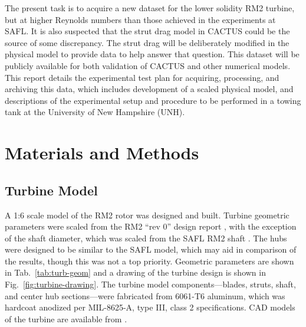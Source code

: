 \documentclass[10pt,letterpaper]{article}
\begin{document}
The present task is to acquire a new dataset for the lower solidity RM2 turbine,
but at higher Reynolds numbers than those achieved in the experiments at SAFL.
It is also suspected that the strut drag model in CACTUS could be the source of
some discrepancy. The strut drag will be deliberately modified in the physical
model to provide data to help answer that question. This dataset will be
publicly available for both validation of CACTUS and other numerical models.
This report details the experimental test plan for acquiring, processing, and
archiving this data, which includes development of a scaled physical model, and
descriptions of the experimental setup and procedure to be performed in a towing
tank at the University of New Hampshire (UNH).

\section*{Materials and Methods}

\subsection*{Turbine Model}

A 1:6 scale model of the RM2 rotor was designed and built. Turbine geometric
parameters were scaled from the RM2 ``rev 0'' design report \cite{Barone2011},
with the exception of the shaft diameter, which was scaled from the SAFL RM2
shaft \cite{Hill2014}. The hubs were designed to be similar to the SAFL model,
which may aid in comparison of the results, though this was not a top priority.
Geometric parameters are shown in Tab.~\ref{tab:turb-geom} and a drawing of the
turbine design is shown in Fig.~\ref{fig:turbine-drawing}. The turbine model
components---blades, struts, shaft, and center hub sections---were fabricated
from 6061-T6 aluminum, which was hardcoat anodized per MIL-8625-A, type III,
class 2 specifications. CAD models of the turbine are available from
\cite{Bachant2015-RM2-CAD}.
\end{document}
